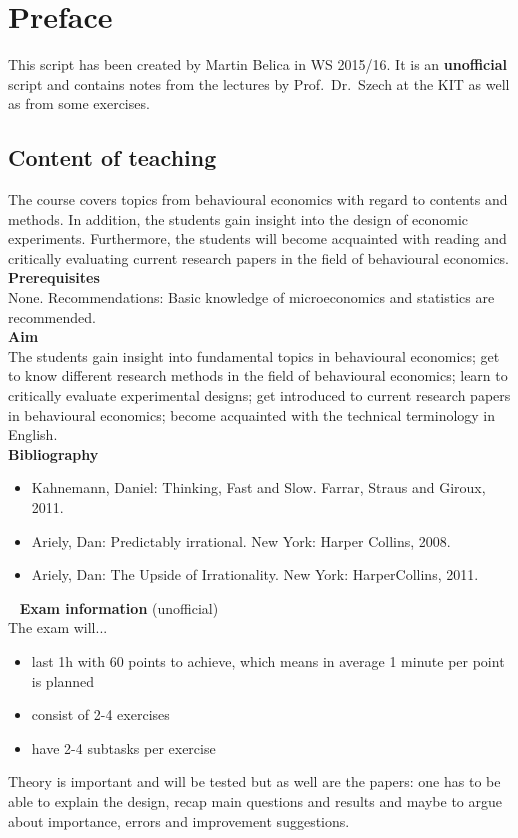

\chapter*{Preface}
This script has been created by Martin Belica in WS 2015/16. It is an \textbf{unofficial} script and contains notes from the lectures by Prof.~Dr.~Szech at the KIT as well as from some exercises.
\section*{Content of teaching}
The course covers topics from behavioural economics with regard to contents and methods. In addition, the students gain insight into the design of economic experiments. Furthermore, the students will become acquainted with reading and critically evaluating current research papers in the field of behavioural economics. \\

\textbf{Prerequisites} \\
None. Recommendations: Basic knowledge of microeconomics and statistics are recommended. \\

\textbf{Aim} \\
The students gain insight into fundamental topics in behavioural economics;
get to know different research methods in the field of behavioural economics;
learn to critically evaluate experimental designs;
get introduced to current research papers in behavioural economics;
become acquainted with the technical terminology in English. \\

\textbf{Bibliography}
\begin{itemize}
	\item Kahnemann, Daniel: Thinking, Fast and Slow. Farrar, Straus and Giroux, 2011.
	\item Ariely, Dan: Predictably irrational. New York: Harper Collins, 2008.
	\item Ariely, Dan: The Upside of Irrationality. New York: HarperCollins, 2011. 
\end{itemize}
~\newline
\textbf{Exam information} (unofficial) \\
The exam will...
\begin{itemize}
	\item last 1h with 60 points to achieve, which means in average 1 minute per point is planned
	\item consist of 2-4 exercises
	\item have 2-4 subtasks per exercise 
\end{itemize}
Theory is important and will be tested but as well are the papers: one has to be able to explain the design, recap main questions and results and maybe to argue about importance, errors and improvement suggestions.
